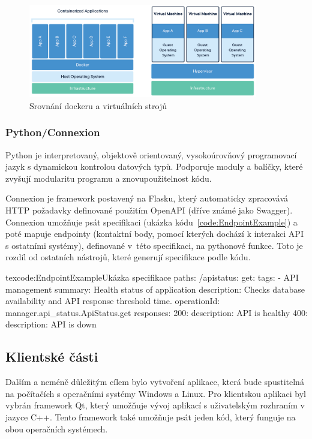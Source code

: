 \documentclass[
  glossaries,
]{kidiplom}
\begin{document}
\begin{figure}[htp]
    \centering
    \includegraphics[width=10cm]{Docker-containerized-and-vm-transparent-bg}
    \caption{Srovnání dockeru a virtuálních strojů \cite{DOCKERIMAGE}}
    \label{fig:DockerSchema}
\end{figure}

\clearpage

\subsubsection{Python/Connexion}
Python je interpretovaný, objektově orientovaný, vysokoúrovňový programovací jazyk s dynamickou kontrolou datových typů. Podporuje moduly a balíčky, které zvyšují modularitu programu a znovupoužitelnost kódu. \cite{PYTHON}

Connexion je framework postavený na Flasku, který automaticky zpracovává HTTP požadavky definované použitím OpenAPI (dříve známé jako Swagger). Connexion umožňuje psát specifikaci (ukázka kódu~\ref{code:EndpointExample}) a poté mapuje endpointy (kontaktní body, pomocí kterých dochází k interakci API s ostatními systémy), definované v~této specifikaci, na pythonové funkce. Toto je rozdíl od ostatních nástrojů, které generují specifikace podle kódu. \cite{CONNEXION}

\begin{kicode}{tex}{code:EndpointExample}{Ukázka specifikace}
paths:
  /apistatus:
    get:
      tags: 
        - API management
      summary: Health status of application
      description: Checks database availability and API response threshold time.
      operationId: manager.api_status.ApiStatus.get
      responses:
        200:
          description: API is healthy
        400:
          description: API is down
\end{kicode}

\subsection{Klientské části}
Dalším a neméně důležitým cílem bylo vytvoření aplikace, která bude spustitelná na počítačích s operačními systémy Windows a Linux. Pro klientskou aplikaci byl vybrán framework Qt, který umožňuje vývoj aplikací s uživatelským rozhraním v jazyce C++. Tento framework také umožňuje psát jeden kód, který funguje na obou operačních systémech.
\end{document}
